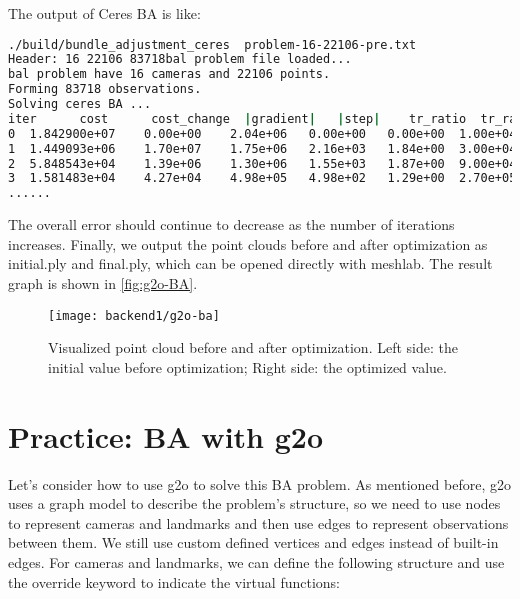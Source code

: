 The output of Ceres BA is like:
\begin{lstlisting}[language=sh,caption=Terminal output]
./build/bundle_adjustment_ceres  problem-16-22106-pre.txt                
Header: 16 22106 83718bal problem file loaded...
bal problem have 16 cameras and 22106 points. 
Forming 83718 observations. 
Solving ceres BA ... 
iter      cost      cost_change  |gradient|   |step|    tr_ratio  tr_radius  ls_iter  iter_time  total_time
0  1.842900e+07    0.00e+00    2.04e+06   0.00e+00   0.00e+00  1.00e+04        0    6.10e-02    2.24e-01
1  1.449093e+06    1.70e+07    1.75e+06   2.16e+03   1.84e+00  3.00e+04        1    1.79e-01    4.03e-01
2  5.848543e+04    1.39e+06    1.30e+06   1.55e+03   1.87e+00  9.00e+04        1    1.56e-01    5.59e-01
3  1.581483e+04    4.27e+04    4.98e+05   4.98e+02   1.29e+00  2.70e+05        1    1.51e-01    7.10e-01
......
\end{lstlisting}

The overall error should continue to decrease as the number of iterations increases. Finally, we output the point clouds before and after optimization as initial.ply and final.ply, which can be opened directly with meshlab. The result graph is shown in \autoref{fig:g2o-BA}.

\begin{figure}[!htp]
	\centering
	\texttt{[image: backend1/g2o-ba]}
	\caption{Visualized point cloud before and after optimization. Left side: the initial value before optimization; Right side: the optimized value.}
	\label{fig:g2o-BA}
\end{figure}

\section{Practice: BA with g2o}
Let's consider how to use g2o to solve this BA problem. As mentioned before, g2o uses a graph model to describe the problem's structure, so we need to use nodes to represent cameras and landmarks and then use edges to represent observations between them. We still use custom defined vertices and edges instead of built-in edges. For cameras and landmarks, we can define the following structure and use the override keyword to indicate the virtual functions:

